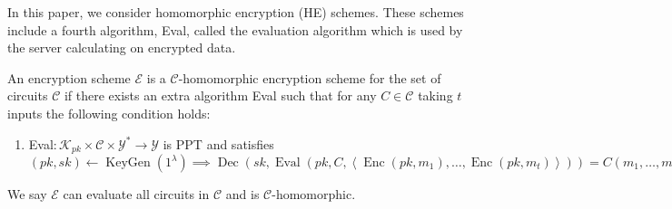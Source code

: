 In this paper, we consider homomorphic encryption (HE) schemes. These schemes include a fourth algorithm, Eval, called the evaluation algorithm which is used by the server calculating on encrypted data.
\begin{definition}
    \label{def:HE-scheme}
An encryption scheme $\mathcal{E}$ is a $\mathcal{C}$-homomorphic encryption scheme for the set of circuits $\mathcal{C}$ if there exists an extra algorithm Eval such that for any $C \in \mathcal{C}$ taking $t$ inputs the following condition holds:
\begin{enumerate}[label={$\bullet$}]
    \item  Eval$ \colon  \mathcal{K}_{pk} \times \mathcal{C} \times \mathcal{Y}^* \to \mathcal{Y}$ is PPT and satisfies $(pk,sk) \leftarrow \operatorname{KeyGen}(1^{\lambda}) \implies \operatorname{Dec}(sk, \operatorname{Eval}(pk, C, \left\langle \operatorname{Enc}(pk, m_1), \dots , \operatorname{Enc}(pk, m_t) \right\rangle)) = C(m_1, \ldots, m_t)$
\end{enumerate}
We say $\mathcal{E}$ can evaluate all circuits in $\mathcal{C}$ and is $\mathcal{C}$-homomorphic.
\end{definition}

